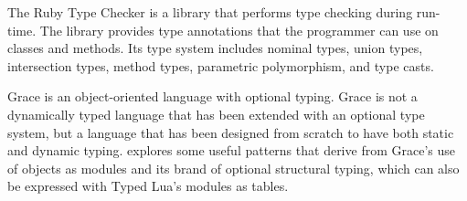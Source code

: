 The Ruby Type Checker \citep{ren2013rtc} is a library that
performs type checking during run-time.
The library provides type annotations that the programmer
can use on classes and methods.
Its type system includes nominal types, union types,
intersection types, method types, parametric polymorphism,
and type casts.

Grace \citep{black2013sg} is an object-oriented language
with optional typing.
Grace is not a dynamically typed language that has been
extended with an optional type system, but a language
that has been designed from scratch to have both
static and dynamic typing.
\citet{homer2013modules} explores some useful patterns
that derive from Grace's use of objects as modules
and its brand of optional structural typing, which
can also be expressed with Typed Lua's modules as tables.

